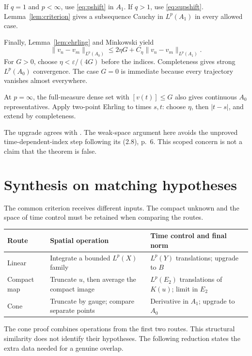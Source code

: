 \documentclass[12pt,reqno]{amsart}
\begin{document}
If $q=1$ and $p<\infty$, use \eqref{eq:pshift} in $A_1$. If $q>1$, use \eqref{eq:supshift}. Lemma~\ref{lem:criterion} gives a subsequence Cauchy in $L^p(A_1)$ in every allowed case.

Finally, Lemma~\ref{lem:ehrling} and Minkowski yield
\begin{equation}\label{eq:coneupgrade}
\|v_n-v_m\|_{L^p(A_0)}
\le2\eta G+C_\eta\|v_n-v_m\|_{L^p(A_1)}.
\end{equation}
For $G>0$, choose $\eta<\varepsilon/(4G)$ before the indices. Completeness gives strong $L^p(A_0)$ convergence. The case $G=0$ is immediate because every trajectory vanishes almost everywhere.

At $p=\infty$, the full-measure dense set with $[v(t)]\le G$ also gives continuous $A_0$ representatives. Apply two-point Ehrling to times $s,t$: choose $\eta$, then $|t-s|$, and extend by completeness.

The upgrade agrees with \cite[equation (2.22), pp.~12--13]{S-barrett-suli}. The weak-space argument here avoids the unproved time-dependent-index step following its (2.8), p.~6. This scoped concern is not a claim that the theorem is false.

\section{Synthesis on matching hypotheses}

The common criterion receives different inputs. The compact unknown and the space of time control must be retained when comparing the routes.
\begin{center}
\begin{tabular}{p{}p{}p{}}
Route & Spatial operation & Time control and final norm \\\hline
Linear & Integrate a bounded $L^p(X)$ family & $L^p(Y)$ translations; upgrade to $B$ \\
Compact map & Truncate $u$, then average the compact image & $L^p(E_2)$ translations of $K(u)$; limit in $E_2$ \\
Cone & Truncate by gauge; compare separate points & Derivative in $A_1$; upgrade to $A_0$
\end{tabular}
\end{center}
The cone proof combines operations from the first two routes. This structural similarity does not identify their hypotheses. The following reduction states the extra data needed for a genuine overlap.
\end{document}
